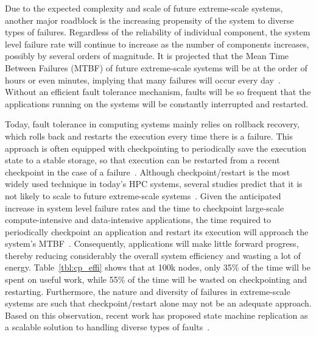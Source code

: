 
Due to the expected complexity and scale of future extreme-scale systems, another major roadblock is the increasing propensity of the system to diverse types of failures. 
Regardless of the reliability of individual component, the system level failure rate will continue to increase as the number of 
components increases, possibly by several orders of magnitude. It is projected that the Mean Time Between Failures (MTBF) of future extreme-scale systems will be at the order of hours or even minutes, implying 
that many failures will occur every day~\cite{Bergman08exascalecomputing}. Without an efficient fault tolerance mechanism, faults will be so frequent that the applications running on the 
systems will be constantly interrupted and restarted.%

Today, fault tolerance in computing systems mainly relies on rollback recovery, which rolls back and restarts the execution 
every time there is a failure. This approach is often equipped with checkpointing to periodically save the execution state to a 
stable storage, so that execution can be restarted from a recent checkpoint in the case of a failure~\cite{Elnozahy:02:Survey,kalaiselvi_sadhana_2000,chandy_trans_1985}. 
Although checkpoint/restart is the most widely used technique in today's HPC systems, several studies predict that it is not likely to scale to future extreme-scale systems~\cite{ferreira_sc_2011,elnozahy_dsc_2004,4367962}. 
Given the anticipated increase in system level failure rates and the time to checkpoint large-scale 
compute-intensive and data-intensive applications, the time required to periodically checkpoint an application 
and restart its execution will approach the system's MTBF~\cite{Cappello:2009:TER:1640402.1640428}. Consequently, applications will make little forward progress, thereby 
reducing considerably the overall system efficiency and wasting a lot of energy. 
Table~\ref{tbl:cp_effi} shows that at 100k nodes, only 35\% of the time will be spent on useful work, while 55\% of the time will be wasted on checkpointing and restarting. 
Furthermore, the nature and diversity of failures in extreme-scale systems are such that checkpoint/restart alone may not be an adequate approach. Based on this observation, recent work has proposed state machine replication as a scalable solution to handling diverse types of faults~\cite{fiala_2012_sdc,ferreira_sc_2011}. 

